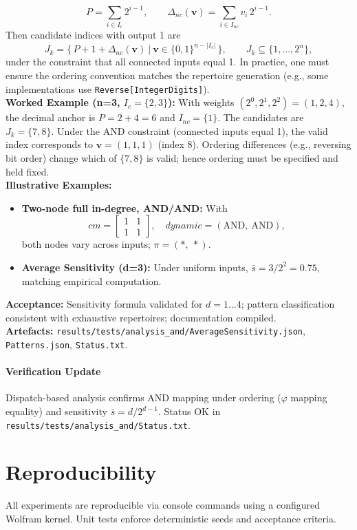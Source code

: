 \documentclass[11pt]{article}
\begin{document}
\[
P=\sum_{i\in I_c}2^{i-1},\qquad \Delta_{nc}(\mathbf{v})=\sum_{i\in I_{nc}} v_i\,2^{i-1}.
\]
Then candidate indices with output 1 are
\[
J_k=\big\{\,P+1+\Delta_{nc}(\mathbf{v})\ \big|\ \mathbf{v}\in\{0,1\}^{n-\lvert I_c\rvert}\,\big\},\qquad J_k\subseteq\{1,\dots,2^n\},
\]
under the constraint that all connected inputs equal 1. In practice, one must ensure the ordering convention matches the repertoire generation (e.g., some implementations use \texttt{Reverse[IntegerDigits]}).\\
\textbf{Worked Example (n=3, \(I_c=\{2,3\}\)):} With weights \((2^{0},2^{1},2^{2})=(1,2,4)\), the decimal anchor is \(P=2+4=6\) and \(I_{nc}=\{1\}\). The candidates are \(J_k=\{7,8\}\). Under the AND constraint (connected inputs equal 1), the valid index corresponds to \(\mathbf{v}=(1,1,1)\) (index 8). Ordering differences (e.g., reversing bit order) change which of \(\{7,8\}\) is valid; hence ordering must be specified and held fixed.\\
\textbf{Illustrative Examples:}
\begin{itemize}
\item \textbf{Two-node full in-degree, AND/AND:} With
\[
cm = \begin{bmatrix}1 & 1\\ 1 & 1\end{bmatrix},\quad dynamic=(\text{AND},\ \text{AND}),
\]
both nodes vary across inputs; \(\pi=(*,\ *)\).
\item \textbf{Average Sensitivity (d=3):} Under uniform inputs, \(\bar{s}=3/2^{2}=0.75\), matching empirical computation.
\end{itemize}
\textbf{Acceptance:} Sensitivity formula validated for \(d=1\dots 4\); pattern classification consistent with exhaustive repertoires; documentation compiled.\\
\textbf{Artefacts:} \texttt{results/tests/analysis\_and/AverageSensitivity.json}, \texttt{Patterns.json}, \texttt{Status.txt}.
\paragraph{Verification Update} Dispatch-based analysis confirms AND mapping under ordering (\(\varphi\) mapping equality) and sensitivity \(\bar{s}=d/2^{d-1}\). Status OK in \texttt{results/tests/analysis\_and/Status.txt}.


\section{Reproducibility}
All experiments are reproducible via console commands using a configured Wolfram kernel. Unit tests enforce deterministic seeds and acceptance criteria.
\end{document}
